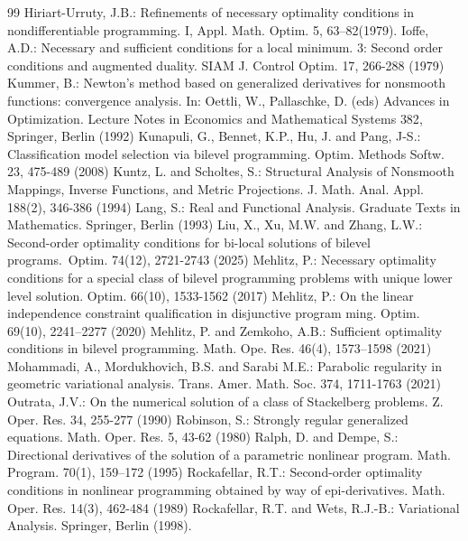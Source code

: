 \documentclass[11pt]{article}
\theoremstyle{definition}
\theoremstyle{remark}
\numberwithin{equation}{section}
\begin{document}
\begin{thebibliography}{99}
 Hiriart-Urruty, J.B.: Refinements of necessary optimality conditions in nondifferentiable    programming. I, Appl. Math. Optim. { 5}, 63–82(1979).
  Ioffe, A.D.: Necessary and sufficient conditions for a local minimum. 3: Second order conditions and augmented duality. SIAM J. Control Optim. { 17}, 266-288 (1979)
Kummer, B.: Newton’s method based on generalized derivatives for nonsmooth functions: convergence    analysis. In: Oettli, W., Pallaschke, D. (eds) Advances in Optimization. Lecture Notes in Economics and    Mathematical Systems {382}, Springer, Berlin (1992)
Kunapuli, G., Bennet, K.P., Hu, J. and Pang, J-S.: Classification model selection
via bilevel programming. Optim. Methods Softw. {23}, 475-489 (2008)
 Kuntz, L. and Scholtes, S.:
Structural Analysis of Nonsmooth Mappings, Inverse Functions, and Metric Projections.
J. Math. Anal. Appl.
{188}(2), 346-386 (1994)
Lang, S.: Real and Functional Analysis. Graduate Texts in Mathematics. Springer, Berlin (1993)
Liu, X., Xu, M.W. and Zhang, L.W.:  Second-order optimality conditions for bi-local solutions of bilevel programs. Optim. 74(12), 2721-2743 (2025)
 Mehlitz, P.: Necessary optimality conditions for a special class of bilevel programming
    problems with unique lower level solution. Optim. {66}(10), 1533-1562 (2017)
    Mehlitz, P.: On the linear independence constraint qualification in disjunctive program
ming. Optim. {69}(10), 2241–2277  (2020)
  Mehlitz, P. and Zemkoho, A.B.: Sufficient optimality conditions in bilevel programming.
Math. Ope. Res.  {46}(4), 1573–1598  (2021)
Mohammadi, A., Mordukhovich, B.S. and  Sarabi M.E.: Parabolic regularity in geometric variational analysis. Trans. Amer. Math. Soc. {374}, 1711-1763 (2021)
 Outrata, J.V.: On the numerical solution of a class of Stackelberg problems. Z. Oper. Res. { 34}, 255-277 (1990)
Robinson, S.: Strongly regular generalized equations.  Math. Oper. Res. { 5}, 43-62 (1980)
  Ralph, D. and Dempe, S.: Directional derivatives of the solution of a parametric nonlinear program.
 Math. Program. {70}(1), 159–172  (1995)
 Rockafellar, R.T.: Second-order optimality conditions in nonlinear programming obtained by way of epi-derivatives. Math. Oper. Res. {14}(3), 462-484 (1989)
Rockafellar, R.T. and Wets, R.J.-B.: Variational Analysis. Springer, Berlin (1998).

\end{thebibliography}
\end{document}
